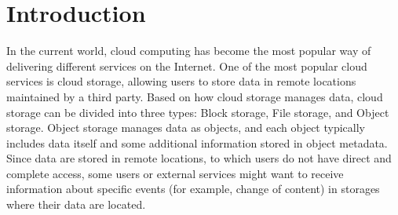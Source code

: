 




\newenvironment{customlegend}[1][]{%
    \begingroup
    \csname pgfplots@init@cleared@structures\endcsname
    \pgfplotsset{#1}%
}{%
    \csname pgfplots@createlegend\endcsname
    \endgroup
}%
\def\addlegendimage{\csname pgfplots@addlegendimage\endcsname}


\chapter{Introduction}\label{chap:introduction}

In the current world, cloud computing has become the most popular way of delivering different services on the Internet. One of the most popular cloud services is cloud storage, allowing users to store data in remote locations maintained by a third party. Based on how cloud storage manages data, cloud storage can be divided into three types: Block storage, File storage, and Object storage. Object storage manages data as objects, and each object typically includes data itself and some additional information stored in object metadata. Since data are stored in remote locations, to which users do not have direct and complete access, some users or external services might want to receive information about specific events (for example, change of content) in storages where their data are located.

